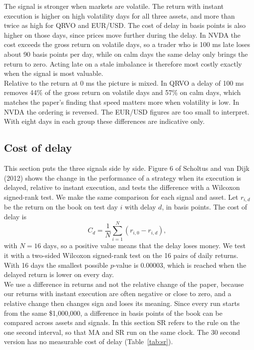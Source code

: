 \documentclass{article}
\begin{document}
\noindent The signal is stronger when markets are volatile. The return with instant execution is higher on high volatility days for all three assets, and more than twice as high for QRVO and EUR/USD. The cost of delay in basis points is also higher on those days, since prices move further during the delay. In NVDA the cost exceeds the gross return on volatile days, so a trader who is 100 ms late loses about 90 basis points per day, while on calm days the same delay only brings the return to zero. Acting late on a stale imbalance is therefore most costly exactly when the signal is most valuable.\\ 

\noindent Relative to the return at 0 ms the picture is mixed. In QRVO a delay of 100 ms removes 44\% of the gross return on volatile days and 57\% on calm days, which matches the paper's finding that speed matters more when volatility is low. In NVDA the ordering is reversed. The EUR/USD figures are too small to interpret. With eight days in each group these differences are indicative only.


\subsection{Cost of delay}
\label{sec:cod}

This section puts the three signals side by side. Figure 6 of Scholtus and van Dijk (2012) shows the change in the performance of a strategy when its execution is delayed, relative to instant execution, and tests the difference with a Wilcoxon signed-rank test. We make the same comparison for each signal and asset. Let $r_{i,d}$ be the return on the book on test day $i$ with delay $d$, in basis points. The cost of delay is
\begin{equation}
C_d = \frac{1}{N} \sum_{i=1}^{N} \left( r_{i,0} - r_{i,d} \right),
\end{equation}
with $N = 16$ days, so a positive value means that the delay loses money. We test it with a two-sided Wilcoxon signed-rank test on the 16 pairs of daily returns. With 16 days the smallest possible $p$-value is 0.00003, which is reached when the delayed return is lower on every day.\\

\noindent We use a difference in returns and not the relative change of the paper, because our returns with instant execution are often negative or close to zero, and a relative change then changes sign and loses its meaning. Since every run starts from the same \$1,000,000, a difference in basis points of the book can be compared across assets and signals. In this section SR refers to the rule on the one second interval, so that MA and SR run on the same clock. The 30 second version has no measurable cost of delay (Table~\ref{tab:sr}).\\
\end{document}
